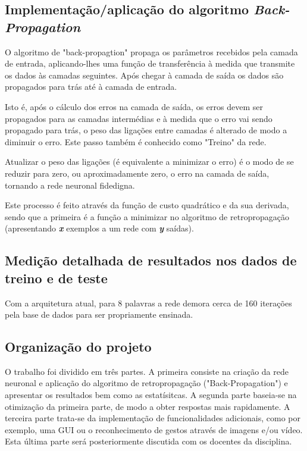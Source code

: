 \documentclass[10pt,a4paper]{article}
\begin{document}
\subsection{Implementação/aplicação do algoritmo \textit{Back-Propagation}}
\subitem

O algoritmo de "back-propagtion" propaga os parâmetros recebidos pela camada de entrada, aplicando-lhes uma função de transferência à medida que transmite os dados às camadas seguintes. Após chegar à camada de saída os dados são propagados para trás até à camada de entrada.

Isto é, após o cálculo dos erros na camada de saída, os erros devem ser propagados para as camadas intermédias e à medida que o erro vai sendo propagado para trás, o peso das ligações entre camadas é alterado de modo a diminuir o erro. Este passo também é conhecido como "Treino" da rede.

Atualizar o peso das ligações (é equivalente a minimizar o erro) é o modo de se reduzir para zero, ou aproximadamente zero, o erro na camada de saída, tornando a rede neuronal fidedigna.

Este processo é feito através da função de custo quadrático e da sua derivada, sendo que a primeira é a função a minimizar no algoritmo de retropropagação (apresentando \textbf{\textit{x}} exemplos a um rede com \textbf{\textit{y}} saídas).


\subsection{Medição detalhada de resultados nos dados de treino e de teste}
\subitem

Com a arquitetura atual, para 8 palavras a rede demora cerca de 160 iterações pela base de dados para ser propriamente ensinada.

\subsection{Organização do projeto}
\subitem

O trabalho foi dividido em três partes. 
A primeira consiste na criação da rede neuronal e aplicação do algoritmo de retropropagação ("Back-Propagation") e apresentar os resultados bem como as estatísitcas.
A segunda parte baseia-se na otimização da primeira parte, de modo a obter respostas mais rapidamente.
A terceira parte trata-se da implementação de funcionalidades adicionais, como por exemplo, uma GUI ou o reconhecimento de gestos através de imagens e/ou vídeo. Esta última parte será posteriormente discutida com os docentes da disciplina.
\end{document}
